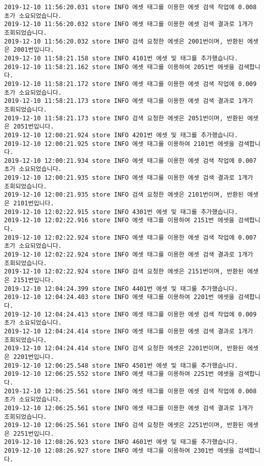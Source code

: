\begin{Verbatim}[fontsize=\tiny, breaklines=true, breakanywhere=true]
2019-12-10 11:56:20.031 store INFO 에셋 태그를 이용한 에셋 검색 작업에 0.008초가 소요되었습니다.
2019-12-10 11:56:20.032 store INFO 에셋 태그를 이용한 에셋 검색 결과로 1개가 조회되었습니다.
2019-12-10 11:56:20.032 store INFO 검색 요청한 에셋은 2001번이며, 반환된 에셋은 2001번입니다.
2019-12-10 11:58:21.158 store INFO 4101번 에셋 및 태그를 추가했습니다.
2019-12-10 11:58:21.162 store INFO 에셋 태그를 이용하여 2051번 에셋을 검색합니다.
2019-12-10 11:58:21.172 store INFO 에셋 태그를 이용한 에셋 검색 작업에 0.009초가 소요되었습니다.
2019-12-10 11:58:21.173 store INFO 에셋 태그를 이용한 에셋 검색 결과로 1개가 조회되었습니다.
2019-12-10 11:58:21.173 store INFO 검색 요청한 에셋은 2051번이며, 반환된 에셋은 2051번입니다.
2019-12-10 12:00:21.924 store INFO 4201번 에셋 및 태그를 추가했습니다.
2019-12-10 12:00:21.925 store INFO 에셋 태그를 이용하여 2101번 에셋을 검색합니다.
2019-12-10 12:00:21.934 store INFO 에셋 태그를 이용한 에셋 검색 작업에 0.007초가 소요되었습니다.
2019-12-10 12:00:21.935 store INFO 에셋 태그를 이용한 에셋 검색 결과로 1개가 조회되었습니다.
2019-12-10 12:00:21.935 store INFO 검색 요청한 에셋은 2101번이며, 반환된 에셋은 2101번입니다.
2019-12-10 12:02:22.915 store INFO 4301번 에셋 및 태그를 추가했습니다.
2019-12-10 12:02:22.916 store INFO 에셋 태그를 이용하여 2151번 에셋을 검색합니다.
2019-12-10 12:02:22.924 store INFO 에셋 태그를 이용한 에셋 검색 작업에 0.007초가 소요되었습니다.
2019-12-10 12:02:22.924 store INFO 에셋 태그를 이용한 에셋 검색 결과로 1개가 조회되었습니다.
2019-12-10 12:02:22.924 store INFO 검색 요청한 에셋은 2151번이며, 반환된 에셋은 2151번입니다.
2019-12-10 12:04:24.399 store INFO 4401번 에셋 및 태그를 추가했습니다.
2019-12-10 12:04:24.403 store INFO 에셋 태그를 이용하여 2201번 에셋을 검색합니다.
2019-12-10 12:04:24.413 store INFO 에셋 태그를 이용한 에셋 검색 작업에 0.009초가 소요되었습니다.
2019-12-10 12:04:24.414 store INFO 에셋 태그를 이용한 에셋 검색 결과로 1개가 조회되었습니다.
2019-12-10 12:04:24.414 store INFO 검색 요청한 에셋은 2201번이며, 반환된 에셋은 2201번입니다.
2019-12-10 12:06:25.548 store INFO 4501번 에셋 및 태그를 추가했습니다.
2019-12-10 12:06:25.552 store INFO 에셋 태그를 이용하여 2251번 에셋을 검색합니다.
2019-12-10 12:06:25.561 store INFO 에셋 태그를 이용한 에셋 검색 작업에 0.008초가 소요되었습니다.
2019-12-10 12:06:25.561 store INFO 에셋 태그를 이용한 에셋 검색 결과로 1개가 조회되었습니다.
2019-12-10 12:06:25.561 store INFO 검색 요청한 에셋은 2251번이며, 반환된 에셋은 2251번입니다.
2019-12-10 12:08:26.923 store INFO 4601번 에셋 및 태그를 추가했습니다.
2019-12-10 12:08:26.927 store INFO 에셋 태그를 이용하여 2301번 에셋을 검색합니다.

\end{Verbatim}
